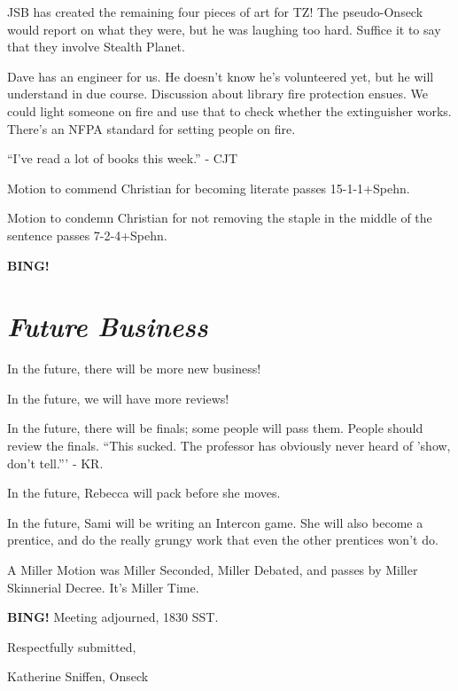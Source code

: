 \documentclass[10pt]{article}
\newcommand{\bing}{{\bf BING!} }
\newcommand{\goto}[1]{\bing \vskip 12pt \section*{{\em{#1}}}}
\begin{document}
JSB has created the remaining four pieces of art for TZ! The pseudo-Onseck would report on what they were, but he was laughing too hard. Suffice it to say that they involve Stealth Planet.

Dave has an engineer for us. He doesn't know he's volunteered yet, but he will understand in due course. Discussion about library fire protection ensues. We could light someone on fire and use that to check whether the extinguisher works. There's an NFPA standard for setting people on fire. 

``I've read a lot of books this week.'' - CJT

Motion to commend Christian for becoming literate passes 15-1-1+Spehn.

Motion to condemn Christian for not removing the staple in the middle of the sentence passes 7-2-4+Spehn.

\goto{Future Business}

In the future, there will be more new business!

In the future, we will have more reviews!

In the future, there will be finals; some people will pass them. People should review the finals. ``This sucked. The professor has obviously never heard of 'show, don't tell.''' - KR.

In the future, Rebecca will pack before she moves.

In the future, Sami will be writing an Intercon game. She will also become a prentice, and do the really grungy work that even the other prentices won't do.

A Miller Motion was Miller Seconded, Miller Debated, and passes by Miller Skinnerial Decree. It's Miller Time. 

\bing
\noindent
Meeting adjourned, 1830 SST.

\vspace{18pt}

\centerline{Respectfully submitted,}
\centerline{Katherine Sniffen, Onseck}
\end{document}

